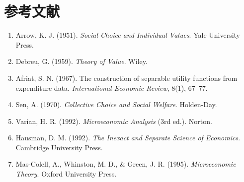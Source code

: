 
\section*{参考文献}
\begin{enumerate}
  \item Arrow, K. J. (1951). \emph{Social Choice and Individual Values}. Yale University Press.
  \item Debreu, G. (1959). \emph{Theory of Value}. Wiley.
  \item Afriat, S. N. (1967). The construction of separable utility functions from expenditure data. \emph{International Economic Review}, 8(1), 67–77.
  \item Sen, A. (1970). \emph{Collective Choice and Social Welfare}. Holden-Day.
  \item Varian, H. R. (1992). \emph{Microeconomic Analysis} (3rd ed.). Norton.
  \item Hausman, D. M. (1992). \emph{The Inexact and Separate Science of Economics}. Cambridge University Press.
  \item Mas-Colell, A., Whinston, M. D., \& Green, J. R. (1995). \emph{Microeconomic Theory}. Oxford University Press.
\end{enumerate}

